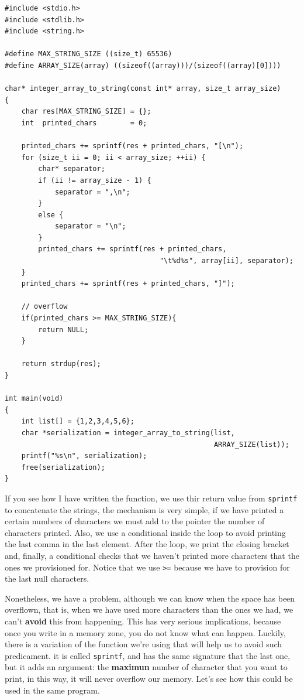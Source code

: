 \documentclass[a4paper]{article}
\begin{document}
\noindent
\begin{minipage}[H]{\linewidth}
\mbox{}
\begin{lstlisting}[style=C,
caption={Example of an advances use of \texttt{sprintf}},
label={lst:sprintfExample}]
#include <stdio.h>
#include <stdlib.h>
#include <string.h>

#define MAX_STRING_SIZE ((size_t) 65536)
#define ARRAY_SIZE(array) ((sizeof((array)))/(sizeof((array)[0])))

char* integer_array_to_string(const int* array, size_t array_size)
{
    char res[MAX_STRING_SIZE] = {};
    int  printed_chars        = 0;

    printed_chars += sprintf(res + printed_chars, "[\n");
    for (size_t ii = 0; ii < array_size; ++ii) {
        char* separator;
        if (ii != array_size - 1) {
            separator = ",\n";
        }
        else {
            separator = "\n";
        }
        printed_chars += sprintf(res + printed_chars,
                                     "\t%d%s", array[ii], separator);
    }
    printed_chars += sprintf(res + printed_chars, "]");

    // overflow
    if(printed_chars >= MAX_STRING_SIZE){
        return NULL;
    }

    return strdup(res);
}

int main(void)
{
    int list[] = {1,2,3,4,5,6};
    char *serialization = integer_array_to_string(list,
                                                  ARRAY_SIZE(list));
    printf("%s\n", serialization);
    free(serialization);
}
\end{lstlisting}
\end{minipage}

If you see how I have written the function, we use thir return value from
\verb!sprintf! to concatenate the strings, the mechanism is very simple, if we
have printed a certain numbers of characters we must add to the pointer the
number of characters printed. Also, we use a conditional inside the loop to
avoid printing the last comma in the last element. After the loop, we print the
closing bracket and, finally, a conditional checks that we haven't printed more
characters that the ones we provisioned for. Notice that we use \verb!>=!
because we have to provision for the last null characters.

Nonetheless, we have a problem, although we can know when the space has been
overflown, that is, when we have used more characters than the ones we had, we
can't \textbf{avoid} this from happening. This has very serious implications,
because once you write in a memory zone, you do not know what can happen.
Luckily, there is a variation of the function we're using that will help us to
avoid such predicament. it is called \verb!sprintf!, and has the same signature
that the last one, but it adds an argument: the \textbf{maximun} number of
character that you want to print, in this way, it will never overflow our
memory. Let's see how this could be used in the same program.
\end{document}
